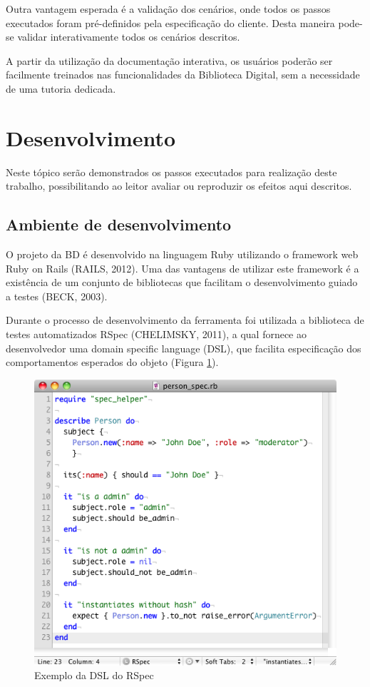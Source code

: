 Outra vantagem esperada é a validação dos cenários, onde todos os passos executados foram pré-definidos pela especificação do cliente. Desta maneira pode-se validar interativamente todos os cenários descritos.

A partir da utilização da documentação interativa, os usuários poderão ser facilmente treinados nas funcionalidades da Biblioteca Digital, sem a necessidade de uma tutoria dedicada.

\section{Desenvolvimento}

Neste tópico serão demonstrados os passos executados para realização deste trabalho, possibilitando ao leitor avaliar ou reproduzir os efeitos aqui descritos.

\subsection{Ambiente de desenvolvimento}

O projeto da BD é desenvolvido na linguagem Ruby utilizando o framework web Ruby on Rails (RAILS, 2012). Uma das vantagens de utilizar este framework é a existência de um conjunto de bibliotecas que facilitam o desenvolvimento guiado a testes (BECK, 2003).

Durante o processo de desenvolvimento da ferramenta foi utilizada a biblioteca de testes automatizados RSpec (CHELIMSKY, 2011), a qual fornece ao desenvolvedor uma domain specific language (DSL), que facilita especificação dos comportamentos esperados do objeto (Figura \ref{figura_31}).

\pagebreak

\begin{figure}[ht]
    \centering
    \includegraphics[width=0.65 \textwidth]{figuras/figura_31}
    \caption{Exemplo da DSL do RSpec}
    \label{figura_31}
\end{figure}

